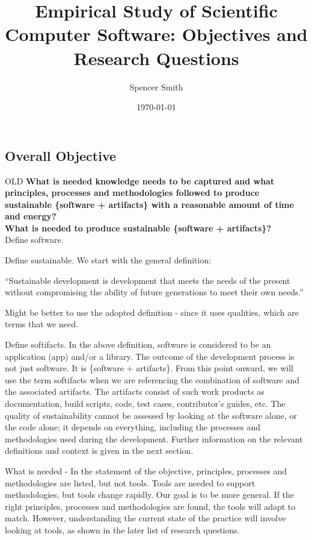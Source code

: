 \documentclass[12pt]{article}
\begin{document}
\title{Empirical Study of Scientific Computer Software: Objectives and Research Questions} 
\author{Spencer Smith}
\date{\today}
	

\subsection* {Overall Objective}

OLD \textbf{What is needed knowledge needs to be captured and what principles, processes and
  methodologies followed to produce sustainable \{software + artifacts\} with
  a reasonable amount of time and energy?}\\

\textbf{What is needed to produce sustainable \{software + artifacts\}?}\\

Define software. 

Define sustainable.  We start with the general definition:

``Sustainable development is development that meets the needs
  of the present without compromising the ability of future generations to meet
  their own needs.'' \citep{Brundtland1987}

Might be better to use the adopted definition - since it uses qualities, which
are terms that we need.

Define softifacts.  In the above definition, software is considered to be an application (app)
and/or a library.  The outcome of the development process is not just software.
It is \{software + artifacts\}.  From this point onward, we will use the term
softifacts when we are referencing the combination of software and the
associated artifacts.  The artifacts consist of such work products as
documentation, build scripts, code, test cases, contributor's guides, etc.  The
quality of sustainability cannot be assessed by looking at the software alone,
or the code alone; it depends on everything, including the processes and
methodologies used during the development.  Further information on the relevant
definitions and context is given in the next section.

What is needed - In the statement of the objective, principles, processes and
methodologies are listed, but not tools.  Tools are needed to support
methodologies, but tools change rapidly.  Our goal is to be more general.  If
the right principles, processes and methodologies are found, the tools will
adapt to match.  However, understanding the current state of the practice will
involve looking at tools, as shown in the later list of research questions.
\end{document}
